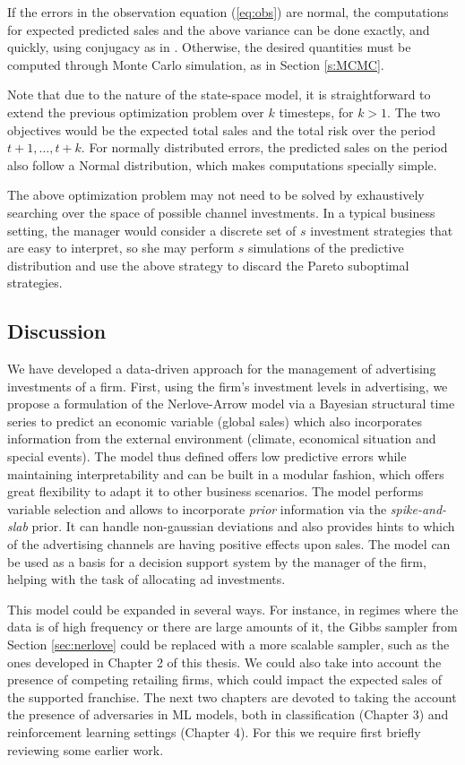 If the errors in the observation equation (\ref{eq:obs}) are normal, the computations for expected predicted sales and the above variance can be done exactly, and quickly, using conjugacy as in \parencite[3.7.1]{zbMATH06123712}.
Otherwise, the desired quantities must be computed through Monte Carlo simulation, as in Section \ref{s:MCMC}.

Note that due to the nature of the state-space model, it is straightforward to extend the previous optimization problem over $k$ timesteps, for $k>1$.
The two objectives would be the expected total sales and the total risk over the period $t+1,\dots,t+k$.
For normally distributed errors, the predicted sales on the period also follow a Normal distribution, which makes computations specially simple.

The above optimization problem may not need to be solved by exhaustively searching over the space of possible channel investments. In a typical business setting, the manager would consider a discrete set of $s$ investment strategies that are easy to interpret, so she may perform $s$ simulations of the predictive distribution and use the above strategy to discard the Pareto suboptimal strategies.

\subsection{Discussion}

We have developed a data-driven approach for the management of advertising investments of a firm. First, using the firm's investment levels in advertising, we propose a formulation of the Nerlove-Arrow model via a Bayesian structural time series to predict an economic variable (global sales)  which also incorporates information from the external environment (climate, economical situation and special events). The model thus defined offers low predictive errors while maintaining interpretability and can be built in a modular fashion, which offers great flexibility to adapt it to other business scenarios. The model performs variable selection and allows to incorporate \emph{prior} information via the \emph{spike-and-slab} prior. It can handle non-gaussian deviations and also provides hints to which of the advertising channels are having positive effects upon sales. The model can be used as a basis for a decision support system by the manager of the firm, helping with the task of allocating ad investments.

This model could be expanded in several ways. For instance, in regimes where the data is of high frequency or there are large amounts of it, the Gibbs sampler from Section \ref{sec:nerlove} could be replaced with a more scalable sampler, such as the ones developed in Chapter 2 of this thesis. We could also take into account the presence of competing retailing firms, which could impact the expected sales of the supported franchise. The next two chapters are devoted to taking the account the presence of adversaries in ML models, both in classification (Chapter 3) and reinforcement learning settings (Chapter 4). For this we require first briefly reviewing some earlier work.

